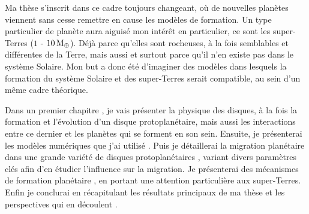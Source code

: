 Ma thèse s'inscrit dans ce cadre toujours changeant, où de nouvelles planètes viennent sans cesse remettre en cause les modèles de formation. Un type particulier de planète aura aiguisé mon intérêt en particulier, ce sont les super-Terres ($1$ - $10\mathrm{\thinspace M_\oplus}$). Déjà parce qu'elles sont rocheuses, à la fois semblables et différentes de la Terre, mais aussi et surtout parce qu'il n'en existe pas dans le système Solaire. Mon but a donc été d'imaginer des modèles dans lesquels la formation du système Solaire et des super-Terres serait compatible, au sein d'un même cadre théorique.

Dans un premier chapitre , je vais présenter la physique des disques, à la fois la formation et l'évolution d'un disque protoplanétaire, mais aussi les interactions entre ce dernier et les planètes qui se forment en son sein. Ensuite, je présenterai les modèles numériques que j'ai utilisé . Puis je détaillerai la migration planétaire dans une grande variété de disques protoplanétaires , variant divers paramètres clés afin d'en étudier l'influence sur la migration. Je présenterai des mécanismes de formation planétaire , en portant une attention particulière aux super-Terres. Enfin je conclurai en récapitulant les résultats principaux de ma thèse et les perspectives qui en découlent .
